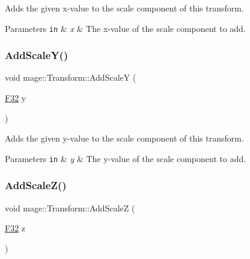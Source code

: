 Adds the given x-\/value to the scale component of this transform.


\begin{DoxyParams}[1]{Parameters}
\mbox{\tt in}  & {\em x} & The x-\/value of the scale component to add. \\
\hline
\end{DoxyParams}
\hypertarget{classmage_1_1_transform_a6f3dbff67c49f2d920c25d46cf25d0ee}{}\label{classmage_1_1_transform_a6f3dbff67c49f2d920c25d46cf25d0ee} 
\subsubsection{\texorpdfstring{Add\+Scale\+Y()}{AddScaleY()}}
{\footnotesize\ttfamily void mage\+::\+Transform\+::\+Add\+ScaleY (\begin{DoxyParamCaption}\item[{\hyperlink{namespacemage_aa97e833b45f06d60a0a9c4fc22ae02c0}{F32}}]{y }\end{DoxyParamCaption})\hspace{0.3cm}{\ttfamily [noexcept]}}

Adds the given y-\/value to the scale component of this transform.


\begin{DoxyParams}[1]{Parameters}
\mbox{\tt in}  & {\em y} & The y-\/value of the scale component to add. \\
\hline
\end{DoxyParams}
\hypertarget{classmage_1_1_transform_ae9aa81d2f6af6422a261878b63a0e5de}{}\label{classmage_1_1_transform_ae9aa81d2f6af6422a261878b63a0e5de} 
\subsubsection{\texorpdfstring{Add\+Scale\+Z()}{AddScaleZ()}}
{\footnotesize\ttfamily void mage\+::\+Transform\+::\+Add\+ScaleZ (\begin{DoxyParamCaption}\item[{\hyperlink{namespacemage_aa97e833b45f06d60a0a9c4fc22ae02c0}{F32}}]{z }\end{DoxyParamCaption})\hspace{0.3cm}{\ttfamily [noexcept]}}

